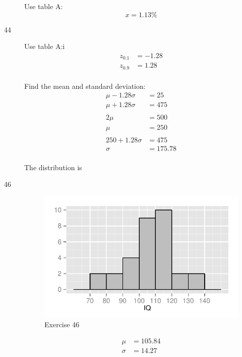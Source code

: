 \documentclass[letterpaper, landscape]{exam}
\begin{document}
\begin{description}
\begin{parts}
            Use table A:\@
            \[
              x = \boxed{ 1.13 \% }
            \]

        \end{parts}

      \item[44]
        Use table A:i\@
        \begin{align*}
          z_{0.1} &= -1.28 \\
          z_{0.9} &= 1.28 \\
        \end{align*}

        Find the mean and standard deviation:
        \begin{align*}
          \mu - 1.28 \sigma &= 25 \\
          \mu + 1.28 \sigma &= 475 \\
          \\
          2 \mu & = 500 \\
          \mu   & = 250 \\
          \\
          250 + 1.28 \sigma & = 475 \\
          \sigma            & = 175.78 \\
        \end{align*}

        The distribution is 

      \item[46]
        \begin{figure}[H]
          \centering
          \includegraphics{figures/ex46.pdf}
          \caption{Exercise 46}
        \end{figure}

        \begin{align*}
          \mu    & = 105.84 \\
          \sigma & = 14.27
        \end{align*}


\end{description}
\end{document}

